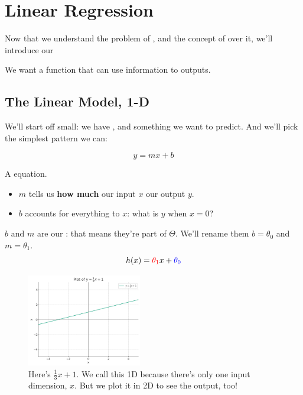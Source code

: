 \pagebreak

\section{Linear Regression}

    Now that we understand the problem of , and the concept of  over it, we'll introduce our 
    
    We want a function that can use information to  outputs.
    
    \subsection{The Linear Model, 1-D}
    
        We'll start off small: we have , and something we want to predict. And we'll pick the simplest pattern we can:

        \begin{equation}
            y = mx+b
        \end{equation}
        
        A  equation.
        
        \begin{itemize}
            \item $m$ tells us \textbf{how much} our input $x$  our output $y$.
            \item $b$ accounts for everything  to $x$: what is $y$ when $x=0$?
        \end{itemize}

        $b$ and $m$ are our : that means they're part of $\Theta$. We'll rename them $b=\theta_0$ and $m=\theta_1$.\\
        
        \begin{equation}
            h(x) = \textcolor{red}{\theta_1} x + \textcolor{blue}{\theta_0}
        \end{equation}

        \begin{figure}[H]
            \centering
            \includegraphics[width=50mm,scale=0.5]{images/regression_images/xover3+1.png}
        
            \caption*{Here's $\frac{1}{3}x+1$. We call this 1D because there's only one input dimension, $x$. But we plot it in 2D to see the output, too!}
        \end{figure}

